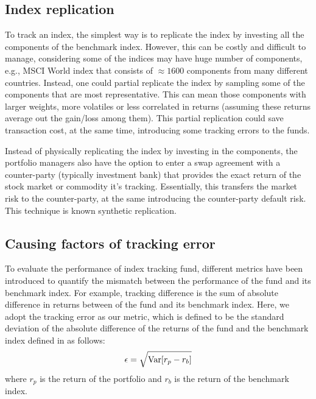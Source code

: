 \subsection{Index replication}
To track an index, the simplest way is to replicate the index by investing all the components of the benchmark index. However, this can be costly and difficult to manage, considering some of the indices may have huge number of components, e.g., MSCI World index that consists of $\approx 1600$ components from many different countries. Instead, one could partial replicate the index by sampling some of the components that are most representative. This can mean those components with larger weights, more volatiles or less correlated in returns (assuming these returns average out the gain/loss among them). This partial replication could save transaction cost, at the same time, introducing some tracking errors to the funds.
 
Instead of physically replicating the index by investing in the components, the portfolio managers also have the option to enter a swap agreement with a counter-party (typically investment bank) that provides the exact return of the stock market or commodity it's tracking. Essentially, this transfers the market risk to the counter-party, at the same introducing the counter-party default risk. This technique is known synthetic replication.
 
\subsection{Causing factors of tracking error}
To evaluate the performance of index tracking fund, different metrics have been introduced to quantify the mismatch between the performance of the fund and its benchmark index. For example, tracking difference is the sum of absolute difference in returns between of the fund and its benchmark index. Here, we adopt the tracking error as our metric, which is defined to be the standard deviation of the absolute difference of the returns of the fund and the benchmark index defined in \cite{BJ13} as follows:
\begin{equation}
  \epsilon = \sqrt{\operatorname{{\mathrm{Var}}}[r_p - r_b]}
\end{equation}
where $r_p$ is the return of the portfolio and $r_b$ is the return of the benchmark index.
 
